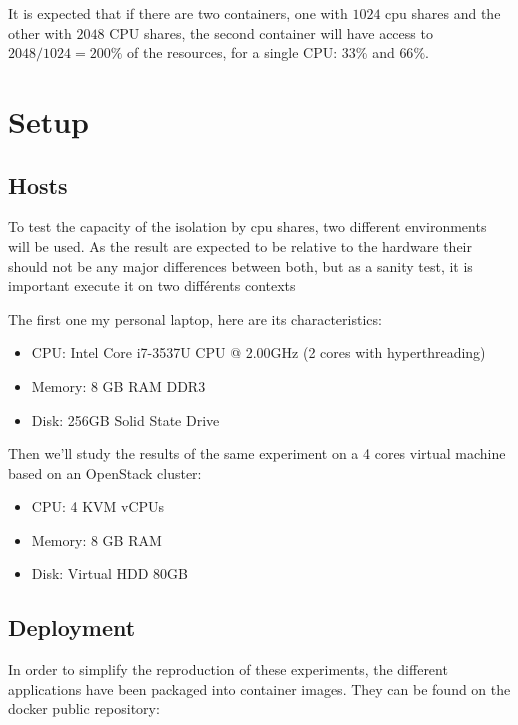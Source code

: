 It is expected that if there are two containers, one with $1024$ cpu shares and
the other with $2048$ CPU shares, the second container will have access to
$2048/1024 = 200\%$ of the resources, for a single CPU: $33\%$ and $66\%$.

\section{Setup}

\subsection{Hosts}

To test the capacity of the isolation by cpu shares, two different environments
will be used. As the result are expected to be relative to the hardware their
should not be any major differences between both, but as a sanity test, it is
important execute it on two différents contexts

The first one my personal laptop, here are its characteristics:

\begin{itemize}
	\item{CPU: Intel\textregistered \hspace{1pt} Core\texttrademark
	\hspace{1pt} i7-3537U CPU @ 2.00GHz (2 cores with hyperthreading)}
	\item{Memory: 8 GB RAM DDR3}
	\item{Disk: 256GB Solid State Drive}
\end{itemize}

Then we'll study the results of the same experiment on a 4 cores virtual
machine based on an OpenStack cluster:

\begin{itemize}
	\item{CPU: 4 KVM vCPUs}
	\item{Memory: 8 GB RAM}
	\item{Disk: Virtual HDD 80GB}
\end{itemize}

\subsection{Deployment}

In order to simplify the reproduction of these experiments, the different
applications have been packaged into container images. They can be found on the
docker public repository:

